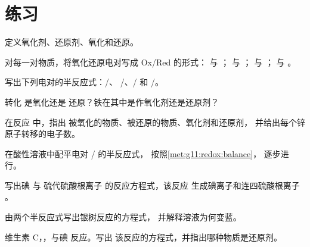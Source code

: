 \section{练习}

\begin{exercise}[$\star$]\label{exo:g11:redox:1}
定义氧化剂、还原剂、氧化和还原。
\end{exercise}

\begin{exercise}[$\star$]\label{exo:g11:redox:2}
对每一对物质，将氧化还原电对写成 Ox/Red 的形式： 与
； 与 ； 与 ；
与 。
\end{exercise}

\begin{exercise}[$\star$]\label{exo:g11:redox:3}
写出下列电对的半反应式：/、
/、/ 和 /。
\end{exercise}

\begin{exercise}[$\star$]\label{exo:g11:redox:4}
转化  是氧化还是
还原？铁在其中是作氧化剂还是还原剂？
\end{exercise}

\begin{exercise}[$\star$]\label{exo:g11:redox:5}
在反应  中，指出
被氧化的物质、被还原的物质、氧化剂和还原剂，
并给出每个锌原子转移的电子数。
\end{exercise}

\begin{exercise}[$\star\star$]\label{exo:g11:redox:6}
在酸性溶液中配平电对 / 的半反应式，
按照\cref{met:g11:redox:balance}，
逐步进行。
\end{exercise}

\begin{exercise}[$\star\star$]\label{exo:g11:redox:7}
写出碘  与
硫代硫酸根离子  的反应方程式，该反应
生成碘离子和连四硫酸根离子 。
\end{exercise}

\begin{exercise}[$\star\star$]\label{exo:g11:redox:8}
由两个半反应式写出银树反应的方程式，
并解释溶液为何变蓝。
\end{exercise}

\begin{exercise}[$\star\star$]\label{exo:g11:redox:9}
维生素 C，，与碘  反应。写出
该反应的方程式，并指出哪种物质是还原剂。
\end{exercise}

